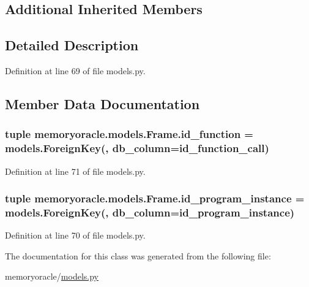 \subsection*{Additional Inherited Members}


\subsection{Detailed Description}


Definition at line 69 of file models.\+py.



\subsection{Member Data Documentation}
\hypertarget{classmemoryoracle_1_1models_1_1Frame_a988356e3b82af6fe51f9f953e881d4ef}{}
\subsubsection[{id\+\_\+function}]{\setlength{\rightskip}{0pt plus 5cm}tuple memoryoracle.\+models.\+Frame.\+id\+\_\+function = models.\+Foreign\+Key(\textquotesingle{}, db\+\_\+column=\textquotesingle{}id\+\_\+function\+\_\+call\textquotesingle{})\hspace{0.3cm}{\ttfamily [static]}}\label{classmemoryoracle_1_1models_1_1Frame_a988356e3b82af6fe51f9f953e881d4ef}


Definition at line 71 of file models.\+py.

\hypertarget{classmemoryoracle_1_1models_1_1Frame_ae4f2ea8ebb8e597c69d3a8aa268bb6f0}{}
\subsubsection[{id\+\_\+program\+\_\+instance}]{\setlength{\rightskip}{0pt plus 5cm}tuple memoryoracle.\+models.\+Frame.\+id\+\_\+program\+\_\+instance = models.\+Foreign\+Key(\textquotesingle{}, db\+\_\+column=\textquotesingle{}id\+\_\+program\+\_\+instance\textquotesingle{})\hspace{0.3cm}{\ttfamily [static]}}\label{classmemoryoracle_1_1models_1_1Frame_ae4f2ea8ebb8e597c69d3a8aa268bb6f0}


Definition at line 70 of file models.\+py.



The documentation for this class was generated from the following file\+:\begin{DoxyCompactItemize}
\item 
memoryoracle/\hyperlink{models_8py}{models.\+py}\end{DoxyCompactItemize}
